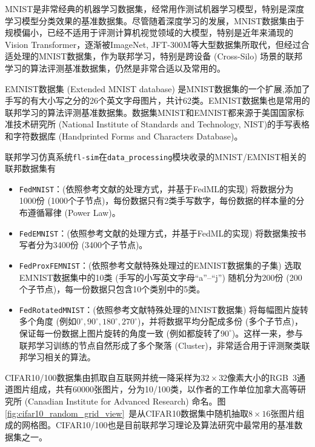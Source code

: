 MNIST是非常经典的机器学习数据集，经常用作测试机器学习模型，特别是深度学习模型分类效果的基准数据集。尽管随着深度学习的发展，MNIST数据集由于规模偏小，已经不适用于评测计算机视觉领域的大模型，特别是近年来涌现的Vision Transformer\cite{dosovitskiy2021_vit}，逐渐被ImageNet\cite{deng2009imagenet}, JFT-300M\cite{Sun_2017_JFT-300M}等大型数据集所取代，但经过合适处理\cite{mcmahan2017fed_avg, caldas2018_leaf, sahu2018fedprox}的MNIST数据集，作为联邦学习，特别是跨设备 (Cross-Silo) 场景的联邦学习的算法评测基准数据集，仍然是非常合适以及常用的\cite{reddi2020fed_opt, tran2021feddr, Ghosh_2022_cfl, li2021pfedmac, t2020pfedme}。

EMNIST数据集 (Extended MNIST database)\cite{cohen2017emnist} 是MNIST数据集的一个扩展,添加了手写的有大小写之分的26个英文字母图片，共计62类。EMNIST数据集也是常用的联邦学习的算法评测基准数据集\cite{sahu2018fedprox, zhang2020fedpd, acar2021feddyn}。数据集MNIST和EMNIST都来源于美国国家标准技术研究所 (National Institute of Standards and Technology, NIST)的手写表格和字符数据库 (Handprinted Forms and Characters Database)\cite{nist-19}。

联邦学习仿真系统\texttt{fl-sim}在\texttt{data\_processing}模块收录的MNIST/EMNIST相关的联邦数据集有
\begin{itemize}
    \item \texttt{FedMNIST}：(依照参考文献\parencite{sahu2018fedprox}的处理方式，并基于FedML\cite{he_2020_fedml}的实现) 将数据分为1000份 (1000个子节点)，每份数据只有2类手写数字，每份数据的样本量的分布遵循幂律 (Power Law)。
    \item \texttt{FedEMNIST}：(依照参考文献\parencite[附录C.2]{reddi2020fed_opt}的处理方式，并基于FedML\cite{he_2020_fedml}的实现) 将数据集按书写者分为3400份 (3400个子节点)。
    \item \texttt{FedProxFEMNIST}：(依照参考文献\parencite{sahu2018fedprox}特殊处理过的EMNIST数据集的子集) 选取EMNIST数据集中的10类 (手写的小写英文字母``a''--``j'') 随机分为200份 (200个子节点)，每一份数据只包含10个类别中的5类。
    \item \texttt{FedRotatedMNIST}：(依照参考文献\parencite{Ghosh_2022_cfl}特殊处理的MNIST数据集) 将每幅图片旋转多个角度 (例如$0^\circ, 90^\circ, 180^\circ, 270^\circ$)，并将数据平均分配成多份 (多个子节点)，保证每一份数据上图片旋转的角度一致 (例如都旋转了$90^\circ$)。这样一来，参与联邦学习训练的节点自然形成了多个聚落 (Cluster)，非常适合用于评测聚类联邦学习相关的算法。
\end{itemize}

CIFAR10/100数据集\cite{cifar}由抓取自互联网并统一降采样为$32\times 32$像素大小的RGB~3通道图片组成，共有60000张图片，分为10/100类，以作者的工作单位加拿大高等研究所 (Canadian Institute for Advanced Research) 命名。图\ref{fig:cifar10_random_grid_view}~是从CIFAR10数据集中随机抽取$8\times 16$张图片组成的网格图。CIFAR10/100也是目前联邦学习理论及算法研究中最常用的基准数据集之一\cite{zhang2020fedpd, acar2021feddyn, Ghosh_2022_cfl}。

